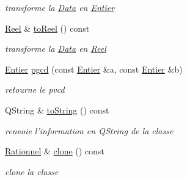 \begin{DoxyCompactItemize}
\begin{DoxyCompactList}\small\item\em transforme la \hyperlink{classNombre_1_1Data}{Data} en \hyperlink{classNombre_1_1Entier}{Entier} \item\end{DoxyCompactList}\item 
\hypertarget{classNombre_1_1Rationnel_a81f1f8f07b7b896ceaa00d4da2461c98}{
\hyperlink{classNombre_1_1Reel}{Reel} \& \hyperlink{classNombre_1_1Rationnel_a81f1f8f07b7b896ceaa00d4da2461c98}{toReel} () const }
\label{classNombre_1_1Rationnel_a81f1f8f07b7b896ceaa00d4da2461c98}

\begin{DoxyCompactList}\small\item\em transforme la \hyperlink{classNombre_1_1Data}{Data} en \hyperlink{classNombre_1_1Reel}{Reel} \item\end{DoxyCompactList}\item 
\hyperlink{classNombre_1_1Entier}{Entier} \hyperlink{classNombre_1_1Rationnel_a887d49ae935aa401e0dcce5c8534b894}{pgcd} (const \hyperlink{classNombre_1_1Entier}{Entier} \&a, const \hyperlink{classNombre_1_1Entier}{Entier} \&b)
\begin{DoxyCompactList}\small\item\em retourne le pvcd \item\end{DoxyCompactList}\item 
\hypertarget{classNombre_1_1Rationnel_a2631c49cbe0ecd80076a274d6c68cc28}{
QString \& \hyperlink{classNombre_1_1Rationnel_a2631c49cbe0ecd80076a274d6c68cc28}{toString} () const }
\label{classNombre_1_1Rationnel_a2631c49cbe0ecd80076a274d6c68cc28}

\begin{DoxyCompactList}\small\item\em renvoie l'information en QString de la classe \item\end{DoxyCompactList}\item 
\hypertarget{classNombre_1_1Rationnel_a982e0d69944eb578cd5d168e11559ab0}{
\hyperlink{classNombre_1_1Rationnel}{Rationnel} \& \hyperlink{classNombre_1_1Rationnel_a982e0d69944eb578cd5d168e11559ab0}{clone} () const }
\label{classNombre_1_1Rationnel_a982e0d69944eb578cd5d168e11559ab0}

\begin{DoxyCompactList}\small\item\em clone la classe \item\end{DoxyCompactList}\end{DoxyCompactItemize}
